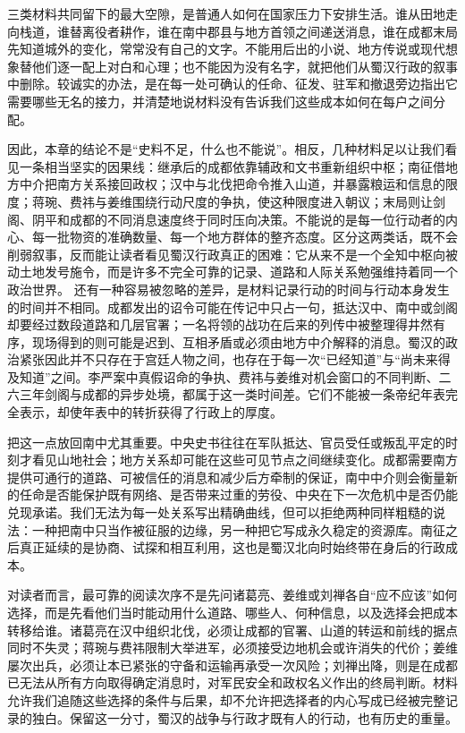 三类材料共同留下的最大空隙，是普通人如何在国家压力下安排生活。谁从田地走向栈道，谁替离役者耕作，谁在南中郡县与地方首领之间递送消息，谁在成都末局先知道城外的变化，常常没有自己的文字。不能用后出的小说、地方传说或现代想象替他们逐一配上对白和心理；也不能因为没有名字，就把他们从蜀汉行政的叙事中删除。较诚实的办法，是在每一处可确认的任命、征发、驻军和撤退旁边指出它需要哪些无名的接力，并清楚地说材料没有告诉我们这些成本如何在每户之间分配。

因此，本章的结论不是“史料不足，什么也不能说”。相反，几种材料足以让我们看见一条相当坚实的因果线：继承后的成都依靠辅政和文书重新组织中枢；南征借地方中介把南方关系接回政权；汉中与北伐把命令推入山道，并暴露粮运和信息的限度；蒋琬、费祎与姜维围绕行动尺度的争执，使这种限度进入朝议；末局则让剑阁、阴平和成都的不同消息速度终于同时压向决策。不能说的是每一位行动者的内心、每一批物资的准确数量、每一个地方群体的整齐态度。区分这两类话，既不会削弱叙事，反而能让读者看见蜀汉行政真正的困难：它从来不是一个全知中枢向被动土地发号施令，而是许多不完全可靠的记录、道路和人际关系勉强维持着同一个政治世界。
还有一种容易被忽略的差异，是材料记录行动的时间与行动本身发生的时间并不相同。成都发出的诏令可能在传记中只占一句，抵达汉中、南中或剑阁却要经过数段道路和几层官署；一名将领的战功在后来的列传中被整理得井然有序，现场得到的则可能是迟到、互相矛盾或必须由地方中介解释的消息。蜀汉的政治紧张因此并不只存在于宫廷人物之间，也存在于每一次“已经知道”与“尚未来得及知道”之间。李严案中真假诏命的争执、费祎与姜维对机会窗口的不同判断、二六三年剑阁与成都的异步处境，都属于这一类时间差。它们不能被一条帝纪年表完全表示，却使年表中的转折获得了行政上的厚度。

把这一点放回南中尤其重要。中央史书往往在军队抵达、官员受任或叛乱平定的时刻才看见山地社会；地方关系却可能在这些可见节点之间继续变化。成都需要南方提供可通行的道路、可被信任的消息和减少后方牵制的保证，南中中介则会衡量新的任命是否能保护既有网络、是否带来过重的劳役、中央在下一次危机中是否仍能兑现承诺。我们无法为每一处关系写出精确曲线，但可以拒绝两种同样粗糙的说法：一种把南中只当作被征服的边缘，另一种把它写成永久稳定的资源库。南征之后真正延续的是协商、试探和相互利用，这也是蜀汉北向时始终带在身后的行政成本。

对读者而言，最可靠的阅读次序不是先问诸葛亮、姜维或刘禅各自“应不应该”如何选择，而是先看他们当时能动用什么道路、哪些人、何种信息，以及选择会把成本转移给谁。诸葛亮在汉中组织北伐，必须让成都的官署、山道的转运和前线的据点同时不失灵；蒋琬与费祎限制大举进军，必须接受边地机会或许消失的代价；姜维屡次出兵，必须让本已紧张的守备和运输再承受一次风险；刘禅出降，则是在成都已无法从所有方向取得确定消息时，对军民安全和政权名义作出的终局判断。材料允许我们追随这些选择的条件与后果，却不允许把选择者的内心写成已经被完整记录的独白。保留这一分寸，蜀汉的战争与行政才既有人的行动，也有历史的重量。

